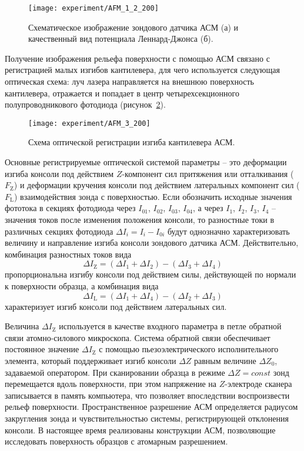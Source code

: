 \begin{figure}[b]
	\centering
	\texttt{[image: experiment/AFM\_1\_2\_200]}
	\vspace{0.5em}
	\caption{Схематическое изображение зондового датчика АСМ (а) и качественный вид потенциала Леннард-Джонса (б).}
	\label{fig:AFM_1_2}
\end{figure}

Получение изображения рельефа поверхности с помощью АСМ связано с регистрацией малых изгибов кантилевера, для чего используется следующая оптическая схема: луч лазера направляется на внешнюю поверхность кантилевера, отражается и попадает в центр четырехсекционного полупроводникового фотодиода (рисунок~\ref{fig:AFM_2}).

\begin{figure}[h]
	\centering
	\texttt{[image: experiment/AFM\_3\_200]}
	\vspace{0.2em}
	\caption{Схема оптической регистрации изгиба кантилевера АСМ.}
	\label{fig:AFM_2}
\end{figure}

Основные регистрируемые оптической системой параметры -- это деформации изгиба консоли под действием $Z$-компонент сил притяжения или отталкивания ($F_\mathrm{Z}$) и деформации кручения консоли под действием латеральных компонент сил ($F_\mathrm{L}$) взаимодействия зонда с поверхностью. Если обозначить исходные значения фототока в секциях фотодиода через $I_{01}$, $I_{02}$, $I_{03}$, $I_{04}$, а через $I_{1}$, $I_{2}$, $I_{3}$, $I_{4}$ -- значения токов после изменения положения консоли, то разностные токи в различных секциях фотодиода $\Delta I_i = I_i - I_{0i}$ будут однозначно характеризовать величину и направление изгиба консоли зондового датчика АСМ. Действительно, комбинация разностных токов вида
\begin{equation}
	\Delta I_\mathrm{Z} = \left(\Delta I_1+\Delta I_2\right)-\left(\Delta I_3+\Delta I_4\right)
\end{equation}
пропорциональна изгибу консоли под действием силы, действующей по нормали к поверхности образца, а комбинация вида
\begin{equation}
	\Delta I_\mathrm{L} = \left(\Delta I_1+\Delta I_4\right)-\left(\Delta I_2+\Delta I_3\right)
\end{equation}
характеризует изгиб консоли под действием латеральных сил.

Величина $\Delta I_\mathrm{Z}$ используется в качестве входного параметра в петле обратной связи атомно-силового микроскопа.
Система обратной связи обеспечивает постоянное значение $\Delta I_\mathrm{Z}$ с помощью пьезоэлектрического исполнительного элемента, который поддерживает изгиб консоли $\Delta Z$ равным величине $\Delta Z_0$, задаваемой оператором.
При сканировании образца в режиме $\Delta Z = const$ зонд перемещается вдоль поверхности, при этом напряжение на $Z$-электроде сканера записывается в память компьютера, что позволяет впоследствии воспроизвести рельеф поверхности.
Пространственное разрешение АСМ определяется радиусом закругления зонда и чувствительностью системы, регистрирующей отклонения консоли.
В настоящее время реализованы конструкции АСМ, позволяющие исследовать поверхность образцов с атомарным разрешением.
